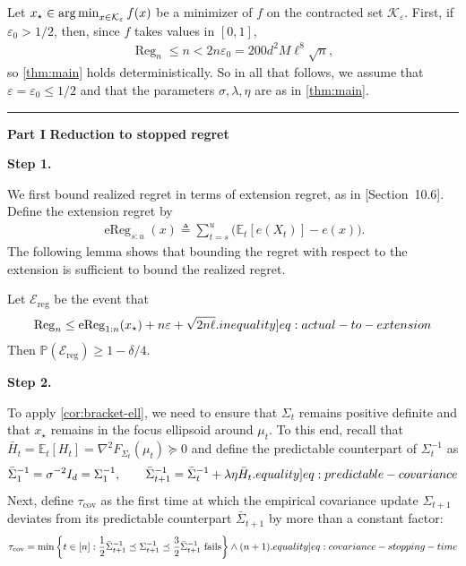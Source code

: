 \documentclass[12pt,cleveref]{jmlr}
\newcommand{\eqlabel}[1]{\label[equality]{#1}}
\newcommand{\ineqlabel}[1]{\label[inequality]{#1}}
\newcommand{\proofpart}[2]{%
    \par\addvspace{1.2\baselineskip}
    \noindent
    \textcolor{blue!55!black}{\rule[-0.2ex]{2pt}{1.25em}}%
    \hspace{0.6em}%
    {\sffamily\bfseries\color{blue!55!black}Part #1}%
    \hspace{0.8em}%
    {\sffamily\bfseries #2}%
    \par\nobreak\smallskip
    \noindent\ignorespaces
}
\newcommand{\proofstepinline}[1]{%
    \par\addvspace{0.6\baselineskip}
    \noindent
    {\normalfont\normalsize\bfseries\color{blue!55!black}Step #1.}\enspace\ignorespaces
}
\newcommand{\E}{\mathbb E}
\newcommand{\Pp}{\mathbb P}
\newcommand{\K}{\mathcal K}
\newcommand{\argmin}{\operatornamewithlimits{arg\,min}}
\newcommand{\1}{\mathbf 1}
\newcommand{\eps}{\varepsilon}
\begin{document}
Let $x_\star \in\argmin_{x\in\K_\eps}f(x)$ be a minimizer of $f$ on the contracted set $\K_\eps$.
First, if $\eps_0>1/2$, then, since $f$ takes values in $[0,1]$,
\begin{align}
    \operatorname{Reg}_n\leq n<2n\eps_0=200d^2M\ell^8\sqrt n,
\end{align}
so \cref{thm:main} holds deterministically.
So in all that follows, we assume that $\eps=\eps_0\leq1/2$ and that the parameters $\sigma,\lambda,\eta$ are as in \cref{thm:main}.
\proofpart{I}{Reduction to stopped regret}
\proofstepinline{1}
We first bound realized regret in terms of extension regret, as in \citet{lattimore2026bandit}[Section~10.6]. Define the extension regret by
\begin{align}
    \operatorname{eReg}_{s:u}(x)
    \triangleq
    \sum_{t=s}^{u}\bigl(\E_t[e(X_t)]-e(x)\bigr).
\end{align}
The following lemma shows that bounding the regret with respect to the extension is sufficient to bound the realized regret.
\begin{lemma}
    \label{lem:actual-to-extension}
    Let $\mathcal E_{\mathrm{reg}}$ be the event that
    \begin{align}
        \operatorname{Reg}_n
        \leq
        \operatorname{eReg}_{1:n}(x_\star)
        +n\eps+\sqrt{2n\ell}.
        \ineqlabel{eq:actual-to-extension}
    \end{align}
    Then $\Pp(\mathcal E_{\mathrm{reg}})\geq1-\delta/4$.
\end{lemma}
\proofstepinline{2}
To apply \cref{cor:bracket-ell}, we need to ensure that $\Sigma_t$ remains positive definite and that $x_\star$ remains in the focus ellipsoid around $\mu_t$.
To this end, recall that $\bar{H}_t = \E_t[H_t] = \nabla^2 F_{\Sigma_t}(\mu_t)\succeq 0$ and define the predictable counterpart of $\Sigma_t^{-1}$ as
\begin{align}
    \bar{\Sigma}_1^{-1}=\sigma^{-2}I_d=\Sigma_1^{-1},
    \qquad
    \bar{\Sigma}_{t+1}^{-1}
    =\bar{\Sigma}_t^{-1}+\lambda\eta \bar{H}_t.
    \eqlabel{eq:predictable-covariance}
\end{align}
Next, define $\tau_{\mathrm{cov}}$ as the first time at which the empirical covariance update $\Sigma_{t+1}$ deviates from its predictable counterpart $\bar{\Sigma}_{t+1}$ by more than a constant factor:
\begin{align}
    \tau_{\mathrm{cov}}
    =
    \min\left\{
        t \in [n]:
        \frac12 \bar{\Sigma}_{t+1}^{-1}
        \preceq
        \Sigma_{t+1}^{-1}
        \preceq
        \frac32 \bar{\Sigma}_{t+1}^{-1}
        \text{ fails}
    \right\}\wedge (n + 1).
    \eqlabel{eq:covariance-stopping-time}
\end{align}
\end{document}
